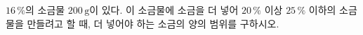 $16\,\%$의 소금물 $200\,\mathrm{g}$이 있다. 이 소금물에 소금을 더 넣어 $20\,\%$ 이상 $25\,\%$ 이하의 소금물을 만들려고 할 때, 더 넣어야 하는 소금의 양의 범위를 구하시오.

